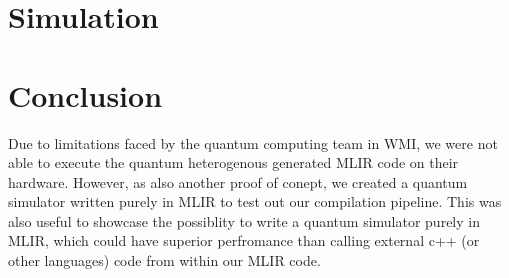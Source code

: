 \section{Simulation}
\section{Conclusion}
Due to limitations faced by the quantum computing team in WMI, we were not able to execute
    the quantum heterogenous generated MLIR code on their hardware.
    However, as also another proof of conept, we created a quantum simulator written purely in MLIR
    to test out our compilation pipeline. This was also useful to
     showcase the possiblity to write a quantum simulator purely in MLIR,
    which could have superior perfromance than calling external c++ (or other languages) code from within our MLIR code.